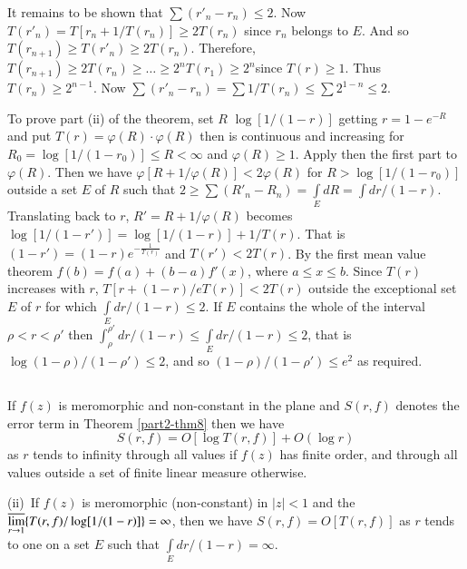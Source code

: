 It remains to be shown that $\sum(r'_{n}-r_{n})\leq 2$. Now
$T(r'_{n})=T[r_{n}+1/T(r_{n})]\geq 2T(r_{n})$ since $r_{n}$ belongs to
$E$. And so $T(r_{n+1})\geq T(r'_{n})\geq 2T(r_{n})$. Therefore,
$T(r_{n+1})\geq 2T(r_{n})\geq \ldots \geq 2^{n}T(r_{1})\geq
2^{n}$\pageoriginale since $T(r)\geq 1$. Thus $T(r_{n})\geq
2^{n-1}$. Now $\sum(r'_{n}-r_{n})=\sum 1/T(r_{n})\leq \sum 2^{1-n}\leq
2$.

To prove part (ii) of the theorem, set $R$ $\log [1/(1-r)]$ getting
$r=1-e^{-R}$ and put $T(r)=\varphi(R)\cdot \varphi(R)$ then is
continuous and increasing for $R_{0}=\log[1/(1-r_{0})]\leq R<\infty$
and $\varphi(R)\geq 1$. Apply then the first part to
$\varphi(R)$. Then we have $\varphi[R+1/\varphi(R)]<2\varphi(R)$ for
$R>\log [1/(1-r_{0})]$ outside a set $E$ of $R$ such that $2\geq \sum
(R'_{n}-R_{n})=\int\limits_{E}dR=\int dr/(1-r)$. Translating back to
$r$, $R'=R+1/\varphi(R)$ becomes
$\log[1/(1-r')]=\log[1/(1-r)]+1/T(r)$. That is
$(1-r')=(1-r)e^{-\frac{1}{T(r)}}$ and $T(r')<2T(r)$. By the first mean
value theorem $f(b)=f(a)+(b-a)f'(x)$, where $a\leq x\leq b$. Since
$T(r)$ increases with $r$, $T[r+(1-r)/eT(r)]<2T(r)$ outside the
exceptional set $E$ of $r$ for which $\int\limits_{E}dr/(1-r)\leq
2$. If $E$ contains the whole of the interval $\rho<r<\rho'$ then
$\int^{\rho'}_{\rho}dr/(1-r)\leq \int\limits_{E}dr/(1-r)\leq 2$, that
is $\log(1-\rho)/(1-\rho')\leq 2$, and so $(1-\rho)/(1-\rho')\leq
e^{2}$ as required.

\subsection{}\label{part2-sec2.3}

\begin{thm}\label{part2-thm9}
If $f(z)$ is meromorphic and non-constant in the plane and $S(r,f)$
denotes the error term in Theorem \ref{part2-thm8} then we have
\begin{equation*}
S(r,f)=O[\log T(r,f)]+O(\log r)\tag{2.5}\label{part2-eq2.5}
\end{equation*}
as $r$ tends to infinity through all values if $f(z)$ has finite
order, and through all values outside a set of finite linear measure
otherwise. 

{\rm(ii)}~If $f(z)$ is meromorphic (non-constant) in $|z|<1$ and the\break
$\mathop{\overline{\lim}}\limits_{r\to 1}\{T(r,f)/\log[1/(1-r)]\}=\infty$,
then we have $S(r,f)=O[T(r,f)]$ as $r$ tends to one on a set $E$ such
that $\int\limits_{E}dr/(1-r)=\infty$. 
\end{thm}

